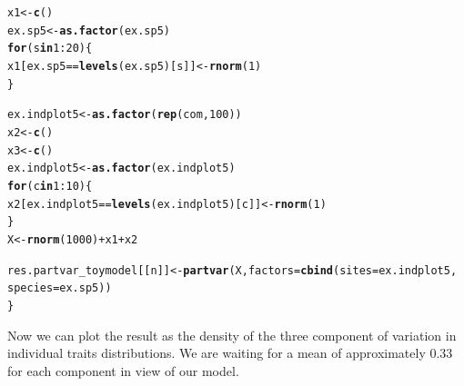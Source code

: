 \documentclass[12pt]{article}\usepackage[]{graphicx}\usepackage[]{color}
\makeatletter
\newcommand{\hlnum}[1]{\textcolor[rgb]{0.686,0.059,0.569}{#1}}%
\newcommand{\hlopt}[1]{\textcolor[rgb]{0,0,0}{#1}}%
\newcommand{\hlstd}[1]{\textcolor[rgb]{0.345,0.345,0.345}{#1}}%
\newcommand{\hlkwa}[1]{\textcolor[rgb]{0.161,0.373,0.58}{\textbf{#1}}}%
\newcommand{\hlkwb}[1]{\textcolor[rgb]{0.69,0.353,0.396}{#1}}%
\newcommand{\hlkwc}[1]{\textcolor[rgb]{0.333,0.667,0.333}{#1}}%
\newcommand{\hlkwd}[1]{\textcolor[rgb]{0.737,0.353,0.396}{\textbf{#1}}}%
\newenvironment{kframe}{%
 \def\at@end@of@kframe{}%
 \ifinner\ifhmode%
  \def\at@end@of@kframe{\end{minipage}}%
  \begin{minipage}{\columnwidth}%
 \fi\fi%
 \def\FrameCommand##1{\hskip\@totalleftmargin \hskip-\fboxsep
 \colorbox{shadecolor}{##1}\hskip-\fboxsep
     \hskip-\linewidth \hskip-\@totalleftmargin \hskip\columnwidth}%
 \MakeFramed {\advance\hsize-\width
   \@totalleftmargin\z@ \linewidth\hsize
   \@setminipage}}%
 {\par\unskip\endMakeFramed%
 \at@end@of@kframe}
\newenvironment{knitrout}{}{} %
\makeatother
\begin{document}
\begin{knitrout}
\begin{kframe}
\begin{alltt}
 \hlstd{x1} \hlkwb{<-} \hlkwd{c}\hlstd{()}
 \hlstd{ex.sp5} \hlkwb{<-} \hlkwd{as.factor}\hlstd{(ex.sp5)}
 \hlkwa{for}\hlstd{(s} \hlkwa{in} \hlnum{1}\hlopt{:}\hlnum{20}\hlstd{)\{}
 \hlstd{x1[ex.sp5} \hlopt{==} \hlkwd{levels}\hlstd{(ex.sp5)[s]]} \hlkwb{<-} \hlkwd{rnorm}\hlstd{(}\hlnum{1}\hlstd{)}
 \hlstd{\}}

 \hlstd{ex.indplot5} \hlkwb{<-} \hlkwd{as.factor}\hlstd{(}\hlkwd{rep}\hlstd{(com,} \hlnum{100}\hlstd{))}
 \hlstd{x2} \hlkwb{<-} \hlkwd{c}\hlstd{()}
 \hlstd{x3} \hlkwb{<-} \hlkwd{c}\hlstd{()}
 \hlstd{ex.indplot5} \hlkwb{<-} \hlkwd{as.factor}\hlstd{(ex.indplot5 )}
 \hlkwa{for}\hlstd{(c} \hlkwa{in} \hlnum{1}\hlopt{:}\hlnum{10}\hlstd{)\{}
 \hlstd{x2[ex.indplot5} \hlopt{==} \hlkwd{levels}\hlstd{(ex.indplot5 )[c]]} \hlkwb{<-} \hlkwd{rnorm}\hlstd{(}\hlnum{1}\hlstd{)}
 \hlstd{\}}
 \hlstd{X} \hlkwb{<-} \hlkwd{rnorm}\hlstd{(}\hlnum{1000}\hlstd{)} \hlopt{+} \hlstd{x1} \hlopt{+} \hlstd{x2}

 \hlstd{res.partvar_toymodel[[n]]} \hlkwb{<-} \hlkwd{partvar}\hlstd{(X,} \hlkwc{factors} \hlstd{=} \hlkwd{cbind}\hlstd{(}\hlkwc{sites} \hlstd{= ex.indplot5,}
               \hlkwc{species} \hlstd{= ex.sp5))}
\hlstd{\}}
\end{alltt}
\end{kframe}
\end{knitrout}

Now we can plot the result as the density of the three component of variation in individual traits distributions. 
We are waiting for a mean of approximately 0.33 for each component in view of our model.
\end{document}
